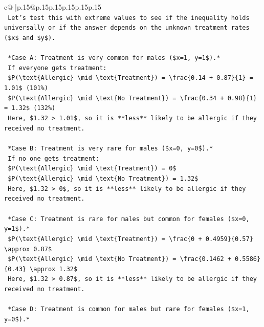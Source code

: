 \documentclass{article}
\begin{document}
{\begin{supertabular}{c@{$\;$}|p{.15\linewidth}@{}p{.15\linewidth}p{.15\linewidth}p{.15\linewidth}p{.15\linewidth}p{.15\linewidth}}
{{{\\ 
\texttt{    Let's test this with extreme values to see if the inequality holds universally or if the answer depends on the unknown treatment rates (\$x\$ and \$y\$).} \\
\\ 
\texttt{    *Case A: Treatment is very common for males (\$x=1, y=1\$).*} \\
\texttt{    If everyone gets treatment:} \\
\texttt{    \$P(\textbackslash{}text\{Allergic\} \textbackslash{}mid \textbackslash{}text\{Treatment\}) = \textbackslash{}frac\{0.14 + 0.87\}\{1\} = 1.01\$ (101\%)} \\
\texttt{    \$P(\textbackslash{}text\{Allergic\} \textbackslash{}mid \textbackslash{}text\{No Treatment\}) = \textbackslash{}frac\{0.34 + 0.98\}\{1\} = 1.32\$ (132\%)} \\
\texttt{    Here, \$1.32 > 1.01\$, so it is **less** likely to be allergic if they received no treatment.} \\
\\ 
\texttt{    *Case B: Treatment is very rare for males (\$x=0, y=0\$).*} \\
\texttt{    If no one gets treatment:} \\
\texttt{    \$P(\textbackslash{}text\{Allergic\} \textbackslash{}mid \textbackslash{}text\{Treatment\}) = 0\$} \\
\texttt{    \$P(\textbackslash{}text\{Allergic\} \textbackslash{}mid \textbackslash{}text\{No Treatment\}) = 1.32\$} \\
\texttt{    Here, \$1.32 > 0\$, so it is **less** likely to be allergic if they received no treatment.} \\
\\ 
\texttt{    *Case C: Treatment is rare for males but common for females (\$x=0, y=1\$).*} \\
\texttt{    \$P(\textbackslash{}text\{Allergic\} \textbackslash{}mid \textbackslash{}text\{Treatment\}) = \textbackslash{}frac\{0 + 0.4959\}\{0.57\} \textbackslash{}approx 0.87\$} \\
\texttt{    \$P(\textbackslash{}text\{Allergic\} \textbackslash{}mid \textbackslash{}text\{No Treatment\}) = \textbackslash{}frac\{0.1462 + 0.5586\}\{0.43\} \textbackslash{}approx 1.32\$} \\
\texttt{    Here, \$1.32 > 0.87\$, so it is **less** likely to be allergic if they received no treatment.} \\
\\ 
\texttt{    *Case D: Treatment is common for males but rare for females (\$x=1, y=0\$).*} \\
}}}
\end{supertabular}}
\end{document}
